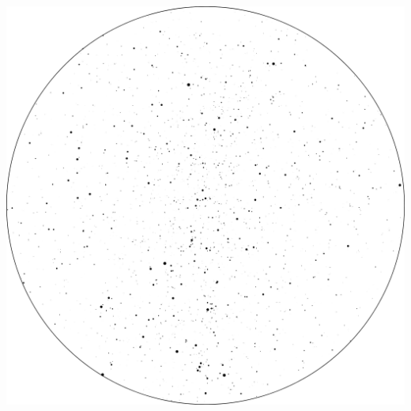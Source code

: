 \documentclass{SAS-class-skygen}
\begin{document}
	\vspace{0.5cm}
    \begin{center}
    \includegraphics[width=\textwidth]{./pics/sky_chart4.png}
    \end{center}
    
    
\end{document}
